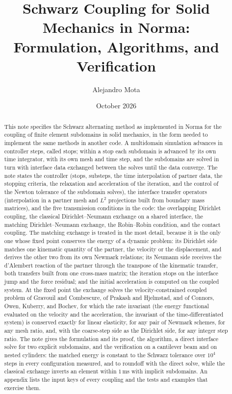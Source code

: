 \documentclass[11pt]{article}
\title{Schwarz Coupling for Solid Mechanics in Norma:\\
Formulation, Algorithms, and Verification}
\author{Alejandro Mota}
\date{October 2026}
\begin{document}
\maketitle

\begin{abstract}
This note specifies the Schwarz alternating method as implemented in
Norma for the coupling of finite element subdomains in solid mechanics,
in the form needed to implement the same methods in another code. A
multidomain simulation advances in controller steps, called stops; within
a stop each subdomain is advanced by its own time integrator, with its own
mesh and time step, and the subdomains are solved in turn with interface
data exchanged between the solves until the data converge. The note
states the controller (stops, substeps, the time interpolation of partner
data, the stopping criteria, the relaxation and acceleration of the
iteration, and the control of the Newton tolerance of the subdomain
solves), the interface transfer operators (interpolation in a partner
mesh and $L^2$ projections built from boundary mass matrices), and the
five transmission conditions in the code: the overlapping Dirichlet
coupling, the classical Dirichlet--Neumann exchange on a shared interface,
the matching Dirichlet--Neumann exchange, the Robin--Robin condition, and
the contact coupling. The matching exchange is treated in the most
detail, because it is the only one whose fixed point conserves the energy
of a dynamic problem: its Dirichlet side matches one kinematic quantity
of the partner, the velocity or the displacement, and derives the other
two from its own Newmark relations; its Neumann side receives the
d'Alembert reaction of the partner through the transpose of the
kinematic transfer, both transfers built from one cross-mass matrix; the
iteration stops on the interface jump and the force residual; and the
initial acceleration is computed on the coupled system. At the fixed
point the exchange solves the velocity-constrained coupled problem of
Gravouil and Combescure, of Prakash and Hjelmstad, and of Connors, Owen,
Kuberry, and Bochev, for which the rate invariant (the energy functional
evaluated on the velocity and the acceleration, the invariant of the
time-differentiated system) is conserved exactly for
linear elasticity, for any pair of Newmark schemes, for any mesh ratio,
and, with the coarse-step side as the Dirichlet side, for any integer
step ratio. The note gives the formulation and its proof, the algorithm,
a direct interface solve for two explicit subdomains, and the
verification on a cantilever beam and on nested cylinders: the matched
energy is constant to the Schwarz tolerance over $10^4$ steps in every
configuration measured, and to roundoff with the direct solve, while the
classical exchange inverts an element within $1$\,ms with implicit
subdomains. An appendix lists the input keys of every coupling and the
tests and examples that exercise them.
\end{abstract}
\end{document}

